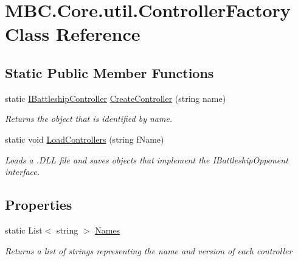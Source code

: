 \hypertarget{class_m_b_c_1_1_core_1_1util_1_1_controller_factory}{\section{M\-B\-C.\-Core.\-util.\-Controller\-Factory Class Reference}
\label{class_m_b_c_1_1_core_1_1util_1_1_controller_factory}
}
\subsection*{Static Public Member Functions}
\begin{DoxyCompactItemize}
\item 
static \hyperlink{interface_m_b_c_1_1_core_1_1_i_battleship_controller}{I\-Battleship\-Controller} \hyperlink{class_m_b_c_1_1_core_1_1util_1_1_controller_factory_ac10a922348ccb9df851b084948943f3d}{Create\-Controller} (string name)
\begin{DoxyCompactList}\small\item\em Returns the object that is identified by name.\end{DoxyCompactList}\item 
static void \hyperlink{class_m_b_c_1_1_core_1_1util_1_1_controller_factory_a8550517417616d362cbd96d7cf72f960}{Load\-Controllers} (string f\-Name)
\begin{DoxyCompactList}\small\item\em Loads a .D\-L\-L file and saves objects that implement the I\-Battleship\-Opponent interface.\end{DoxyCompactList}\end{DoxyCompactItemize}
\subsection*{Properties}
\begin{DoxyCompactItemize}
\item 
\hypertarget{class_m_b_c_1_1_core_1_1util_1_1_controller_factory_a7120a568455917999b3f7428161a491e}{static List$<$ string $>$ \hyperlink{class_m_b_c_1_1_core_1_1util_1_1_controller_factory_a7120a568455917999b3f7428161a491e}{Names}}\label{class_m_b_c_1_1_core_1_1util_1_1_controller_factory_a7120a568455917999b3f7428161a491e}

\begin{DoxyCompactList}\small\item\em Returns a list of strings representing the name and version of each controller\end{DoxyCompactList}\end{DoxyCompactItemize}


